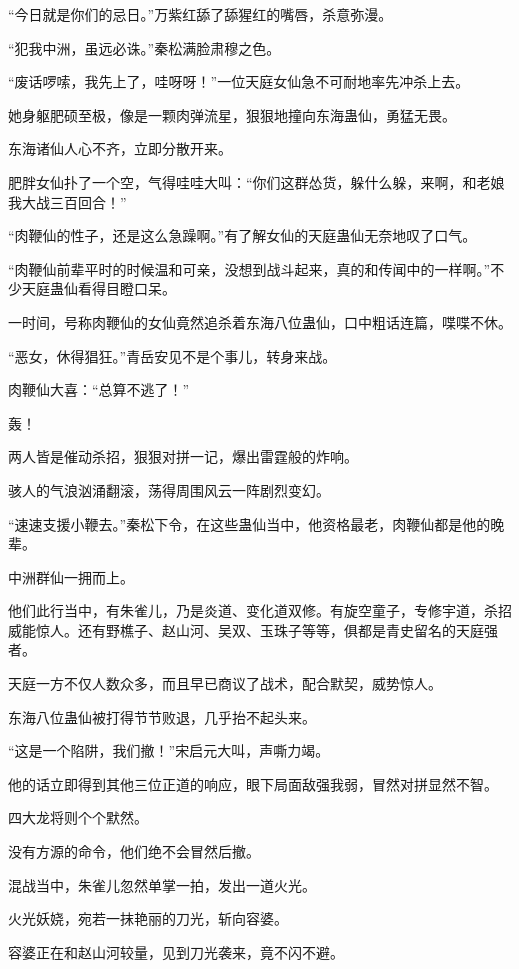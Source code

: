 \begin{this_body}
“今日就是你们的忌日。”万紫红舔了舔猩红的嘴唇，杀意弥漫。

“犯我中洲，虽远必诛。”秦松满脸肃穆之色。

“废话啰嗦，我先上了，哇呀呀！”一位天庭女仙急不可耐地率先冲杀上去。

她身躯肥硕至极，像是一颗肉弹流星，狠狠地撞向东海蛊仙，勇猛无畏。

东海诸仙人心不齐，立即分散开来。

肥胖女仙扑了一个空，气得哇哇大叫：“你们这群怂货，躲什么躲，来啊，和老娘我大战三百回合！”

“肉鞭仙的性子，还是这么急躁啊。”有了解女仙的天庭蛊仙无奈地叹了口气。

“肉鞭仙前辈平时的时候温和可亲，没想到战斗起来，真的和传闻中的一样啊。”不少天庭蛊仙看得目瞪口呆。

一时间，号称肉鞭仙的女仙竟然追杀着东海八位蛊仙，口中粗话连篇，喋喋不休。

“恶女，休得猖狂。”青岳安见不是个事儿，转身来战。

肉鞭仙大喜：“总算不逃了！”

轰！

两人皆是催动杀招，狠狠对拼一记，爆出雷霆般的炸响。

骇人的气浪汹涌翻滚，荡得周围风云一阵剧烈变幻。

“速速支援小鞭去。”秦松下令，在这些蛊仙当中，他资格最老，肉鞭仙都是他的晚辈。

中洲群仙一拥而上。

他们此行当中，有朱雀儿，乃是炎道、变化道双修。有旋空童子，专修宇道，杀招威能惊人。还有野樵子、赵山河、吴双、玉珠子等等，俱都是青史留名的天庭强者。

天庭一方不仅人数众多，而且早已商议了战术，配合默契，威势惊人。

东海八位蛊仙被打得节节败退，几乎抬不起头来。

“这是一个陷阱，我们撤！”宋启元大叫，声嘶力竭。

他的话立即得到其他三位正道的响应，眼下局面敌强我弱，冒然对拼显然不智。

四大龙将则个个默然。

没有方源的命令，他们绝不会冒然后撤。

混战当中，朱雀儿忽然单掌一拍，发出一道火光。

火光妖娆，宛若一抹艳丽的刀光，斩向容婆。

容婆正在和赵山河较量，见到刀光袭来，竟不闪不避。


\end{this_body}
